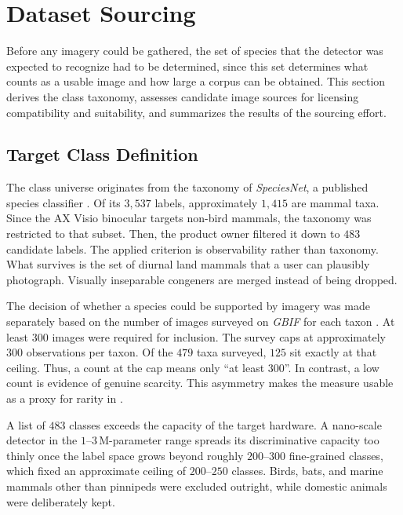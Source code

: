 \section{Dataset Sourcing}\label{sec:data_sourcing_and_taxonomy}

Before any imagery could be gathered, the set of species that the detector was expected to recognize had to be determined, since this set determines what counts as a usable image and how large a corpus can be obtained. This section derives the class taxonomy, assesses candidate image sources for licensing compatibility and suitability, and summarizes the results of the sourcing effort.

\subsection{Target Class Definition}\label{sec:target_class_definition}

The class universe originates from the taxonomy of \textit{SpeciesNet}, a published species classifier \cite{gadotCropNotCrop2024a}. Of its $3{,}537$ labels, approximately $1{,}415$ are mammal taxa. Since the AX Visio binocular targets non-bird mammals, the taxonomy was restricted to that subset. Then, the product owner filtered it down to $483$ candidate labels.  %
The applied criterion is observability rather than taxonomy. What survives is the set of diurnal land mammals that a user can plausibly photograph. Visually inseparable congeners are merged instead of being dropped.

The decision of whether a species could be supported by imagery was made separately based on the number of images surveyed on \textit{GBIF} for each taxon \cite{GBIF}. At least $300$ images were required for inclusion.  %
The survey caps at approximately $300$ observations per taxon. Of the $479$ taxa surveyed, $125$ sit exactly at that ceiling. Thus, a count at the cap means only \enquote{at least $300$}. In contrast, a low count is evidence of genuine scarcity. This asymmetry makes the measure usable as a proxy for rarity in .

A list of $483$ classes exceeds the capacity of the target hardware. A nano-scale detector in the $1$--$3\,\mathrm{M}$-parameter range spreads its discriminative capacity too thinly once the label space grows beyond roughly $200$--$300$ fine-grained classes, which fixed an approximate ceiling of $200$--$250$ classes. Birds, bats, and marine mammals other than pinnipeds were excluded outright, while domestic animals were deliberately kept.

